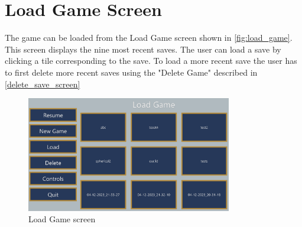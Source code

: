\section{Load Game Screen}
The game can be loaded from the Load Game screen shown in \autoref{fig:load_game}.
This screen displays the nine most recent saves.
The user can load a save by clicking a tile corresponding to the save.
To load a more recent save the user has to first delete more recent saves using the "Delete Game" described in \autoref{delete_save_screen}

\begin{figure}[h]
    \centering
    \includegraphics[width=0.8\textwidth]{chapters/user_manual/resources/load-game.png}
    \caption{Load Game screen}
    \label{fig:load_game}
\end{figure}